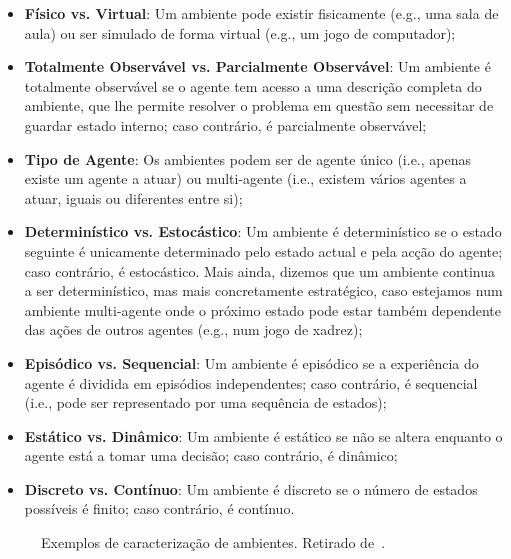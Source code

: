 \begin{itemize}
    \item \textbf{Físico vs. Virtual}: Um ambiente pode existir fisicamente (e.g., uma sala de aula) ou ser simulado de forma virtual (e.g., um jogo de computador);
    \item \textbf{Totalmente Observável vs. Parcialmente Observável}: Um ambiente é totalmente observável se o agente tem acesso a uma descrição completa do ambiente, que lhe permite resolver o problema em questão sem necessitar de guardar estado interno; caso contrário, é parcialmente observável;
    \item \textbf{Tipo de Agente}: Os ambientes podem ser de agente único (i.e., apenas existe um agente a atuar) ou multi-agente (i.e., existem vários agentes a atuar, iguais ou diferentes entre si);
    \item \textbf{Determinístico vs. Estocástico}: Um ambiente é determinístico se o estado seguinte é unicamente determinado pelo estado actual e pela acção do agente; caso contrário, é estocástico.
    Mais ainda, dizemos que um ambiente continua a ser determinístico, mas mais concretamente estratégico, caso estejamos num ambiente multi-agente onde o próximo estado pode estar também dependente das ações de outros agentes (e.g., num jogo de xadrez);
    \item \textbf{Episódico vs. Sequencial}: Um ambiente é episódico se a experiência do agente é dividida em episódios independentes; caso contrário, é sequencial (i.e., pode ser representado por uma sequência de estados);
    \item \textbf{Estático vs. Dinâmico}: Um ambiente é estático se não se altera enquanto o agente está a tomar uma decisão; caso contrário, é dinâmico;
    \item \textbf{Discreto vs. Contínuo}: Um ambiente é discreto se o número de estados possíveis é finito; caso contrário, é contínuo.
\end{itemize}

\begin{figure}[H]
    \begin{center}
    \end{center}
    \caption{Exemplos de caracterização de ambientes.
    Retirado de~\cite{ist:leic:resumos:agentes}.}\label{fig:ambientes-exemplos}
\end{figure}


